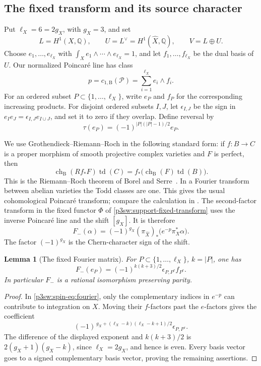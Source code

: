 \documentclass[11pt]{article}
\newcommand{\Q}{\mathbb Q}
\newtheorem{lemma}[theorem]{Lemma}
\numberwithin{equation}{section}
\begin{document}
\subsection{The fixed transform and its source character}

Put \(\ell_X=6=2g_X\), with \(g_X=3\), and set
\[
 L=H^1(X,\Q),\qquad U=L^\vee=H^1(\widehat X,\Q),\qquad V=L\oplus U.
\]
Choose \(e_1,\ldots,e_{\ell_X}\) with
\(\int_X e_1\wedge\cdots\wedge e_{\ell_X}=1\), and let \(f_1,\ldots,f_{\ell_X}\)
be the dual basis of \(U\).  Our normalized Poincar\'e line has class
\[
 p=c_{1,\mathrm B}(\mathcal P)=\sum_{i=1}^{\ell_X} e_i\wedge f_i.
\]
For an ordered subset \(P\subset\{1,\ldots,\ell_X\}\), write \(e_P\) and
\(f_P\) for the corresponding increasing products.  For disjoint
ordered subsets \(I,J\), let \(\epsilon_{I,J}\) be the sign in
\(e_Ie_J=\epsilon_{I,J}e_{I\cup J}\), and set it to zero if they
overlap.  Define reversal by
\[
 \tau(e_P)=(-1)^{|P|(|P|-1)/2}e_P .
\]

We use Grothendieck--Riemann--Roch in the following standard form:
if \(f:B\to C\) is a proper morphism of smooth projective complex
varieties and \(F\) is perfect, then
\[
 \operatorname{ch}_{\mathrm B}(Rf_*F)\operatorname{td}(C)
   =f_*\bigl(\operatorname{ch}_{\mathrm B}(F)\operatorname{td}(B)\bigr).
\]
This is the Riemann--Roch theorem of Borel and
Serre~\cite{p3swBorelSerreRR}.
In a Fourier transform between abelian varieties the Todd classes
are one.  This gives the usual cohomological Poincar\'e transform;
compare the calculation in
\cite[Section~4.2.3]{GolyshevLuntsOrlov2001}.
The second-factor transform in the fixed functor \(\Phi\) of
\eqref{p3sw:support-fixed-transform} uses the inverse Poincar\'e line
and the shift \([g_X]\).  It is therefore
\begin{equation}
\label{p3sw:spin-eq:fourier}
 F_-(\alpha)=(-1)^{g_X}(\pi_{\widehat X})_*
            \bigl(e^{-p}\pi_X^*\alpha\bigr).
\end{equation}
The factor \((-1)^{g_X}\) is the Chern-character sign of the shift.

\begin{lemma}[The fixed Fourier matrix]
\label{p3sw:fourier-matrix}
For \(P\subset\{1,\ldots,\ell_X\}\), \(k=|P|\), one has
\[
 F_-(e_P)=(-1)^{k(k+3)/2}\epsilon_{P,P^c}f_{P^c}.
\]
In particular \(F_-\) is a rational isomorphism preserving parity.
\end{lemma}

\begin{proof}
In \eqref{p3sw:spin-eq:fourier}, only the complementary indices in
\(e^{-p}\) can contribute to integration on \(X\).  Moving their
\(f\)-factors past the \(e\)-factors gives the coefficient
\[
 (-1)^{\,g_X+(\ell_X-k)(\ell_X-k+1)/2}\epsilon_{P,P^c}.
\]
The difference of the displayed exponent and \(k(k+3)/2\) is
\(2(g_X+1)(g_X-k)\), since \(\ell_X=2g_X\), and hence is even.  Every basis
vector goes to a signed complementary basis vector, proving the
remaining assertions.
\end{proof}
\end{document}
